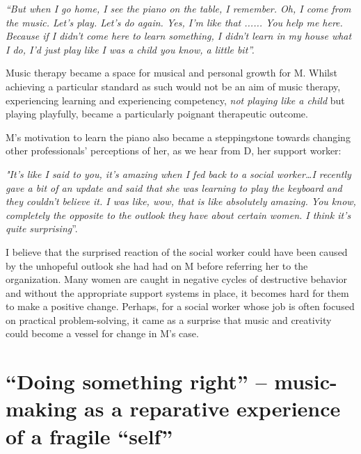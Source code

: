 \documentclass[authordate, empirical]{jote-new-article}
\begin{document}
\emph{“But when I go home, I see the piano on the table, I remember. Oh, I come from the music. Let's play. Let's do again. Yes, I'm like that ...... You help me here. Because if I didn't come here to learn something, I didn't learn in my house what I do, I'd just play like I was a child you know, a little bit”. }







Music therapy became a space for musical and personal growth for M. Whilst achieving a particular standard as such would not be an aim of music therapy, experiencing learning and experiencing competency,\emph{ not playing like a child }but playing playfully, became a particularly poignant therapeutic outcome.







M's motivation to learn the piano also became a steppingstone towards changing other professionals' perceptions of her, as we hear from D, her support worker:







\emph{"It's like I said to you, it's amazing when I fed back to a social worker…I recently gave a bit of an update and said that she was learning to play the keyboard and they couldn't believe it. I was like, wow, that is like absolutely amazing. You know, completely the opposite to the outlook they have about certain women. I think it's quite surprising}”.







I believe that the surprised reaction of the social worker could have been caused by the unhopeful outlook she had had on M before referring her to the organization. Many women are caught in negative cycles of destructive behavior and without the appropriate support systems in place, it becomes hard for them to make a positive change. Perhaps, for a social worker whose job is often focused on practical problem-solving, it came as a surprise that music and creativity could become a vessel for change in M's case.







\section{“Doing something right” -- music-making as a reparative experience of a fragile “self”}
\end{document}
